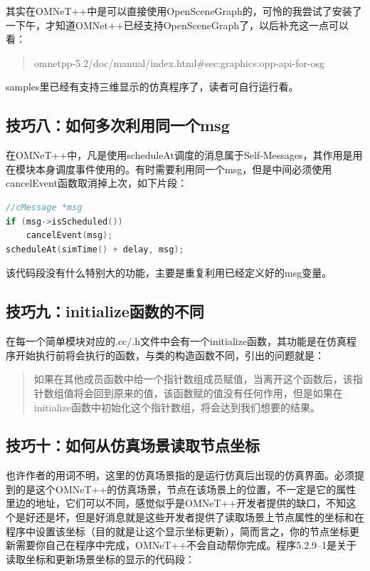 其实在OMNeT++中是可以直接使用OpenSceneGraph的，可怜的我尝试了安装了一下午，才知道OMNet++已经支持OpenSceneGraph了，以后补充这一点可以看：

\begin{quote}
omnetpp-5.2\slash doc\slash manual\slash index.html\#sec:graphics:opp-api-for-osg 
\end{quote}

samples里已经有支持三维显示的仿真程序了，读者可自行运行看。

\subsection{技巧八：如何多次利用同一个msg}
\label{技巧八：如何多次利用同一个bmsgb}

在OMNeT++中，凡是使用scheduleAt调度的消息属于Self-Messages，其作用是用在模块本身调度事件使用的。有时需要利用同一个msg，但是中间必须使用cancelEvent函数取消掉上次，如下片段：

\begin{lstlisting}[language=c]
//cMessage *msg
if (msg->isScheduled())
    cancelEvent(msg);
scheduleAt(simTime() + delay, msg);
\end{lstlisting}

该代码段没有什么特别大的功能，主要是重复利用已经定义好的msg变量。

\subsection{技巧九：initialize函数的不同}
\label{技巧九：initialize函数的不同}

在每一个简单模块对应的.cc\slash .h文件中会有一个initialize函数，其功能是在仿真程序开始执行前将会执行的函数，与类的构造函数不同，引出的问题就是：

\begin{quote}
如果在其他成员函数中给一个指针数组成员赋值，当离开这个函数后，该指针数组值将会回到原来的值，该函数赋的值没有任何作用，但是如果在initialize函数中初始化这个指针数组，将会达到我们想要的结果。
\end{quote}

\subsection{技巧十：如何从仿真场景读取节点坐标}
\label{技巧十：如何从仿真场景读取节点坐标}

也许作者的用词不明，这里的仿真场景指的是运行仿真后出现的仿真界面。必须提到的是这个OMNeT++的仿真场景，节点在该场景上的位置，不一定是它的属性里边的地址，它们可以不同，感觉似乎是OMNeT++开发者提供的缺口，不知这个是好还是坏，但是好消息就是这些开发者提供了读取场景上节点属性的坐标和在程序中设置该坐标（目的就是让这个显示坐标更新），简而言之，你的节点坐标更新需要你自己在程序中完成，OMNeT++不会自动帮你完成。程序5.2.9--1是关于读取坐标和更新场景坐标的显示的代码段：

